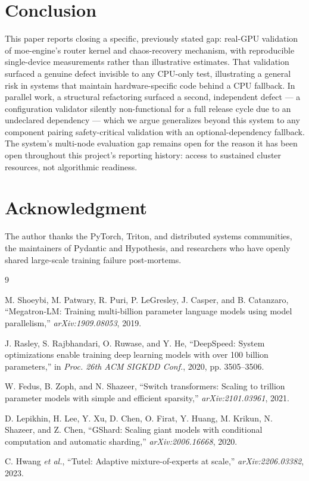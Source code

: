 \documentclass[conference]{IEEEtran}
\begin{document}
\section{Conclusion}

This paper reports closing a specific, previously stated gap: real-GPU
validation of moe-engine's router kernel and chaos-recovery mechanism,
with reproducible single-device measurements rather than illustrative
estimates. That validation surfaced a genuine defect invisible to any
CPU-only test, illustrating a general risk in systems that maintain
hardware-specific code behind a CPU fallback. In parallel work, a
structural refactoring surfaced a second, independent defect --- a
configuration validator silently non-functional for a full release cycle
due to an undeclared dependency --- which we argue generalizes beyond this
system to any component pairing safety-critical validation with an
optional-dependency fallback. The system's multi-node evaluation gap
remains open for the reason it has been open throughout this project's
reporting history: access to sustained cluster resources, not algorithmic
readiness.

\section*{Acknowledgment}
The author thanks the PyTorch, Triton, and distributed systems
communities, the maintainers of Pydantic and Hypothesis, and researchers
who have openly shared large-scale training failure post-mortems.

\begin{thebibliography}{9}

M. Shoeybi, M. Patwary, R. Puri, P. LeGresley, J. Casper, and B.
Catanzaro, ``Megatron-LM: Training multi-billion parameter language
models using model parallelism,'' \emph{arXiv:1909.08053}, 2019.

J. Rasley, S. Rajbhandari, O. Ruwase, and Y. He, ``DeepSpeed: System
optimizations enable training deep learning models with over 100 billion
parameters,'' in \emph{Proc. 26th ACM SIGKDD Conf.}, 2020, pp. 3505--3506.

W. Fedus, B. Zoph, and N. Shazeer, ``Switch transformers: Scaling to
trillion parameter models with simple and efficient sparsity,''
\emph{arXiv:2101.03961}, 2021.

D. Lepikhin, H. Lee, Y. Xu, D. Chen, O. Firat, Y. Huang, M. Krikun, N.
Shazeer, and Z. Chen, ``GShard: Scaling giant models with conditional
computation and automatic sharding,'' \emph{arXiv:2006.16668}, 2020.

C. Hwang \emph{et al.}, ``Tutel: Adaptive mixture-of-experts at scale,''
\emph{arXiv:2206.03382}, 2023.

\end{thebibliography}
\end{document}
